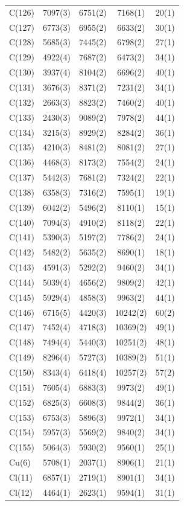 \begin{center}
{\begin{supertabular}{lcccc}
C(126)&7097(3)&6751(2)&7168(1)&20(1)\\
C(127)&6773(3)&6955(2)&6633(2)&30(1)\\
C(128)&5685(3)&7445(2)&6798(2)&27(1)\\
C(129)&4922(4)&7687(2)&6473(2)&34(1)\\
C(130)&3937(4)&8104(2)&6696(2)&40(1)\\
C(131)&3676(3)&8371(2)&7231(2)&34(1)\\
C(132)&2663(3)&8823(2)&7460(2)&40(1)\\
C(133)&2430(3)&9089(2)&7978(2)&44(1)\\
C(134)&3215(3)&8929(2)&8284(2)&36(1)\\
C(135)&4210(3)&8481(2)&8081(2)&27(1)\\
C(136)&4468(3)&8173(2)&7554(2)&24(1)\\
C(137)&5442(3)&7681(2)&7324(2)&22(1)\\
C(138)&6358(3)&7316(2)&7595(1)&19(1)\\
C(139)&6042(2)&5496(2)&8110(1)&15(1)\\
C(140)&7094(3)&4910(2)&8118(2)&22(1)\\
C(141)&5390(3)&5197(2)&7786(2)&24(1)\\
C(142)&5482(2)&5635(2)&8690(1)&18(1)\\
C(143)&4591(3)&5292(2)&9460(2)&34(1)\\
C(144)&5039(4)&4656(2)&9809(2)&42(1)\\
C(145)&5929(4)&4858(3)&9963(2)&44(1)\\
C(146)&6715(5)&4420(3)&10242(2)&60(2)\\
C(147)&7452(4)&4718(3)&10369(2)&49(1)\\
C(148)&7494(4)&5440(3)&10251(2)&48(1)\\
C(149)&8296(4)&5727(3)&10389(2)&51(1)\\
C(150)&8343(4)&6418(4)&10257(2)&57(2)\\
C(151)&7605(4)&6883(3)&9973(2)&49(1)\\
C(152)&6825(3)&6608(3)&9844(2)&36(1)\\
C(153)&6753(3)&5896(3)&9972(1)&34(1)\\
C(154)&5957(3)&5569(2)&9840(2)&34(1)\\
C(155)&5064(3)&5930(2)&9560(1)&25(1)\\
Cu(6)&5708(1)&2037(1)&8906(1)&21(1)\\
Cl(11)&6857(1)&2719(1)&8901(1)&34(1)\\
Cl(12)&4464(1)&2623(1)&9594(1)&31(1)\\

\end{supertabular}}
\end{center}
